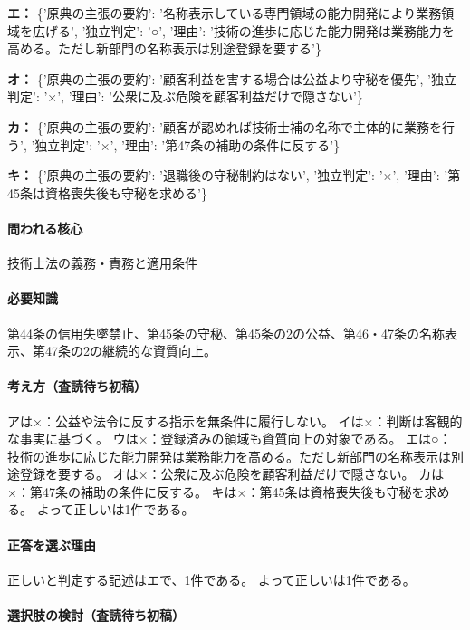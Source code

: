 \noindent\textbf{エ：} \{'原典の主張の要約': '名称表示している専門領域の能力開発により業務領域を広げる', '独立判定': '○', '理由': '技術の進歩に応じた能力開発は業務能力を高める。ただし新部門の名称表示は別途登録を要する'\}\par

\noindent\textbf{オ：} \{'原典の主張の要約': '顧客利益を害する場合は公益より守秘を優先', '独立判定': '×', '理由': '公衆に及ぶ危険を顧客利益だけで隠さない'\}\par

\noindent\textbf{カ：} \{'原典の主張の要約': '顧客が認めれば技術士補の名称で主体的に業務を行う', '独立判定': '×', '理由': '第47条の補助の条件に反する'\}\par

\noindent\textbf{キ：} \{'原典の主張の要約': '退職後の守秘制約はない', '独立判定': '×', '理由': '第45条は資格喪失後も守秘を求める'\}\par

\paragraph{問われる核心} 技術士法の義務・責務と適用条件

\paragraph{必要知識} 第44条の信用失墜禁止、第45条の守秘、第45条の2の公益、第46・47条の名称表示、第47条の2の継続的な資質向上。

\paragraph{考え方（査読待ち初稿）} アは×：公益や法令に反する指示を無条件に履行しない。 イは×：判断は客観的な事実に基づく。 ウは×：登録済みの領域も資質向上の対象である。 エは○：技術の進歩に応じた能力開発は業務能力を高める。ただし新部門の名称表示は別途登録を要する。 オは×：公衆に及ぶ危険を顧客利益だけで隠さない。 カは×：第47条の補助の条件に反する。 キは×：第45条は資格喪失後も守秘を求める。 よって正しいは1件である。

\paragraph{正答を選ぶ理由} 正しいと判定する記述はエで、1件である。  よって正しいは1件である。

\paragraph{選択肢の検討（査読待ち初稿）}\mbox{}\par


